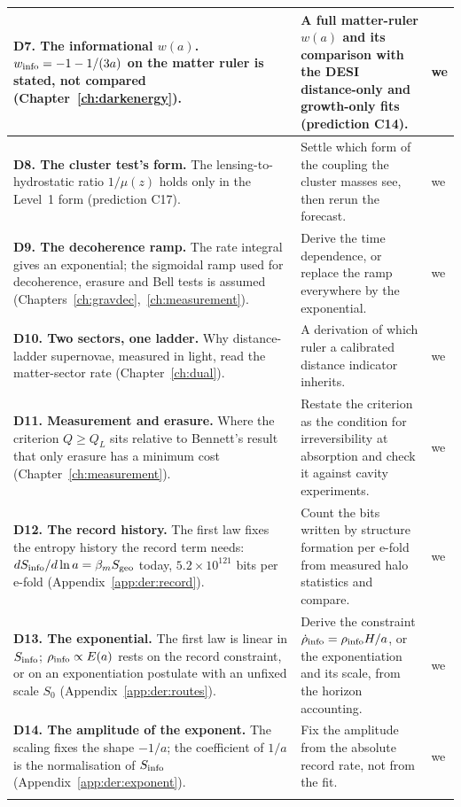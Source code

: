 {\begin{longtable}{@{}>{\raggedright\arraybackslash}p{}>{\raggedright\arraybackslash}p{}>{\raggedright\arraybackslash}p{}@{}}
\textbf{D7. The informational $w(a)$.} $w_{\rm info}=-1-1/(3a)$ on the matter ruler is stated, not compared (Chapter~\ref{ch:darkenergy}).
 & A full matter-ruler $w(a)$ and its comparison with the DESI distance-only and growth-only fits (prediction C14). & we \\\cmidrule[0.2pt]{1-3}
\textbf{D8. The cluster test's form.} The lensing-to-hydrostatic ratio $1/\mu(z)$ holds only in the Level~1 form (prediction C17).
 & Settle which form of the coupling the cluster masses see, then rerun the forecast. & we \\\cmidrule[0.2pt]{1-3}
\textbf{D9. The decoherence ramp.} The rate integral gives an exponential; the sigmoidal ramp used for decoherence, erasure and Bell
 tests is assumed (Chapters~\ref{ch:gravdec},~\ref{ch:measurement}). & Derive the time dependence, or replace the ramp everywhere by the exponential. & we \\\cmidrule[0.2pt]{1-3}
\textbf{D10. Two sectors, one ladder.} Why distance-ladder supernovae, measured in light, read the matter-sector rate (Chapter~\ref{ch:dual}).
 & A derivation of which ruler a calibrated distance indicator inherits. & we \\\cmidrule[0.2pt]{1-3}
\textbf{D11. Measurement and erasure.} Where the criterion $Q\ge Q_L$ sits relative to Bennett's result that only erasure has a minimum cost
 (Chapter~\ref{ch:measurement}). & Restate the criterion as the condition for irreversibility at absorption and check it against cavity experiments. & we \\\cmidrule[0.2pt]{1-3}
\textbf{D12. The record history.} The first law fixes the entropy history the record term needs: $dS_{\rm info}/d\ln a=\beta_mS_{\rm geo}$
 today, $5.2\times10^{121}$ bits per e-fold (Appendix~\ref{app:der:record}).
 & Count the bits written by structure formation per e-fold from measured halo statistics and compare. & we \\\cmidrule[0.2pt]{1-3}
\textbf{D13. The exponential.} The first law is linear in $S_{\rm info}$; $\rho_{\rm info}\propto E(a)$ rests on the record constraint, or on an
 exponentiation postulate with an unfixed scale $S_0$ (Appendix~\ref{app:der:routes}).
 & Derive the constraint $\dot\rho_{\rm info}=\rho_{\rm info}H/a$, or the exponentiation and its scale, from the horizon accounting. & we \\\cmidrule[0.2pt]{1-3}
\textbf{D14. The amplitude of the exponent.} The scaling fixes the shape $-1/a$; the coefficient of $1/a$ is the normalisation of $S_{\rm info}$
 (Appendix~\ref{app:der:exponent}). & Fix the amplitude from the absolute record rate, not from the fit. & we \\\cmidrule[0.2pt]{1-3}

\end{longtable}}
